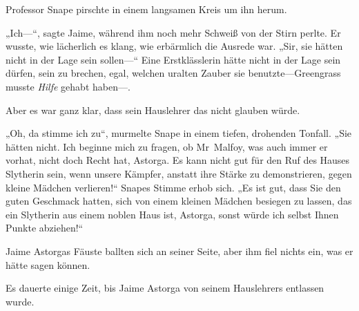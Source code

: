 Professor Snape pirschte in einem langsamen Kreis um ihn herum.

„Ich—“, sagte Jaime, während ihm noch mehr Schweiß von der Stirn perlte. Er wusste, wie lächerlich es klang, wie erbärmlich die Ausrede war. „Sir, sie hätten nicht in der Lage sein sollen—“ Eine Erstklässlerin hätte nicht in der Lage sein dürfen, sein  zu brechen, egal, welchen uralten Zauber sie benutzte—Greengrass musste \emph{Hilfe} gehabt haben—.

Aber es war ganz klar, dass sein Hauslehrer das nicht glauben würde.

„Oh, da stimme ich zu“, murmelte Snape in einem tiefen, drohenden Tonfall. „Sie hätten nicht. Ich beginne mich zu fragen, ob Mr~Malfoy, was auch immer er vorhat, nicht doch Recht hat, Astorga. Es kann nicht gut für den Ruf des Hauses Slytherin sein, wenn unsere Kämpfer, anstatt ihre Stärke zu demonstrieren, gegen kleine Mädchen verlieren!“ Snapes Stimme erhob sich. „Es ist gut, dass Sie den guten Geschmack hatten, sich von einem kleinen Mädchen besiegen zu lassen, das ein Slytherin aus einem noblen Haus ist, Astorga, sonst würde ich selbst Ihnen Punkte abziehen!“

Jaime Astorgas Fäuste ballten sich an seiner Seite, aber ihm fiel nichts ein, was er hätte sagen können.

Es dauerte einige Zeit, bis Jaime Astorga von seinem Hauslehrers entlassen wurde.

